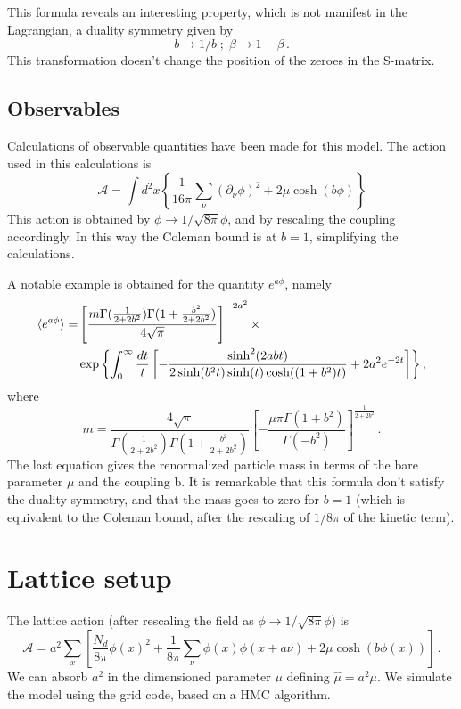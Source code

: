 \documentclass[12pt,a4paper]{report}
\begin{document}
This formula reveals an interesting property, which is not manifest in the Lagrangian, a duality symmetry given by \begin{equation}
b \to 1/b \; ; \; \beta \to 1- \beta \,.
\end{equation} This transformation doesn't change the position of the zeroes in the S-matrix.


\section{Observables}
Calculations of observable quantities have been made for this model. 
The action used in this calculations is \begin{equation}
\mathcal{A} = \int d^2x  \left\lbrace\dfrac{1}{16 \pi} \sum_\nu (\partial_\nu \phi )^2 + 2 \mu \cosh(b \phi) \right\rbrace 
\end{equation} This action is obtained by $\phi \to 1/ \sqrt{8 \pi} \phi$,
   and by rescaling the coupling accordingly. In this way the Coleman bound is at $b=1$, simplifying the calculations. 
   
   A notable example is obtained for the quantity $e^{a\phi}$, namely
\begin{align}
\braket{e^{a \phi}} =  &\left[ \dfrac{m\Gamma(\frac{1}{2+2b^2}) \Gamma(1+ \frac{b^2}{2+2b^2}) }{4 \sqrt{\pi}}  \right]^{-2 a^2} \times  \\ & \exp{\left\lbrace \int_0^\infty \dfrac{dt}{t} \left[ - \dfrac{\sinh^2(2 a b t)}{2 \sinh(b^2t) \sinh(t)\cosh((1+b^2)t) } + 2 a^2 e^{-2t} \right]  \right\rbrace } \nonumber \,,
\end{align} where \begin{equation}
\label{eq:mass_continuum}
m = \dfrac{4 \sqrt{\pi}}{\Gamma(\frac{1}{2+2b^2})\Gamma(1 +\frac{b^2}{2+2b^2}) } \left[ - \dfrac{\mu \pi \Gamma(1+b^2)}{\Gamma(-b^2)} \right]^{\frac{1}{2+2b^2}} \,.
\end{equation} The last equation gives the renormalized particle mass in terms of the bare parameter $\mu$ and the coupling b. It is remarkable that this formula don't satisfy the duality symmetry, and that the mass goes to zero for $b=1$ (which is equivalent to the Coleman bound, after the rescaling of $1/8\pi$ of the kinetic term).

\chapter{Lattice setup}

The lattice action (after rescaling the field as $\phi \to 1/\sqrt{8 \pi} \phi $) is \begin{equation}
\mathcal{A} = a^2 \sum_x \left[ \dfrac{N_d}{8 \pi} \phi(x)^2 + \dfrac{1}{8\pi} \sum_\nu \phi(x) \phi(x+ a \nu) +2  \mu \cosh(b\phi(x)) \right] \,.
\end{equation} We can absorb $a^2$ in the dimensioned parameter $\mu$ defining $\hat \mu = a^2 \mu$. We simulate the model using the grid code, based on a HMC algorithm.  
\end{document}
